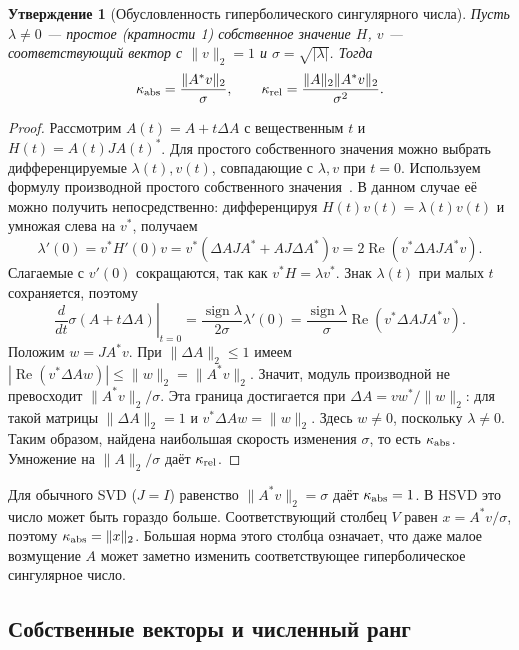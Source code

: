 \documentclass[a4paper,12pt]{article}
\theoremstyle{csstyle}
\newtheorem{proposition}[theorem]{Утверждение}
\begin{document}
\begin{proposition}[Обусловленность гиперболического сингулярного числа]
\label{analysis:prop-condition-number}
Пусть $\lambda\ne0$ --- простое (кратности 1) собственное значение $H$,
$v$ --- соответствующий вектор с $\|v\|_2=1$ и
$\sigma=\sqrt{|\lambda|}$. Тогда
\[
\kappa_{\rm abs}=\frac{\|A^*v\|_2}{\sigma},\qquad
\kappa_{\rm rel}=\frac{\|A\|_2\|A^*v\|_2}{\sigma^2}.
\]
\end{proposition}
\begin{proof}
Рассмотрим $A(t)=A+t\Delta A$ с вещественным $t$ и
$H(t)=A(t)JA(t)^*$. Для простого собственного значения можно
выбрать дифференцируемые $\lambda(t),v(t)$, совпадающие с $\lambda,v$
при $t=0$. Используем формулу производной простого собственного
значения~\cite[теорема~1]{GreenbaumLiOverton2020}. В данном случае её можно
получить непосредственно: дифференцируя $H(t)v(t)=\lambda(t)v(t)$
и умножая слева на $v^*$, получаем
\[
\lambda'(0)=v^*H'(0)v
=v^*(\Delta AJA^*+AJ\Delta A^*)v
=2\operatorname{Re}(v^*\Delta AJA^*v).
\]
Слагаемые с $v'(0)$ сокращаются, так как $v^*H=\lambda v^*$.
Знак $\lambda(t)$ при малых $t$ сохраняется, поэтому
\[
\left.\frac{d}{dt}\sigma(A+t\Delta A)\right|_{t=0}
=\frac{\operatorname{sign}\lambda}{2\sigma}\lambda'(0)
=\frac{\operatorname{sign}\lambda}{\sigma}
\operatorname{Re}(v^*\Delta AJA^*v).
\]
Положим $w=JA^*v$. При $\|\Delta A\|_2\le1$ имеем
$|\operatorname{Re}(v^*\Delta Aw)|\le\|w\|_2=\|A^*v\|_2$.
Значит, модуль производной не превосходит $\|A^*v\|_2/\sigma$.
Эта граница достигается при $\Delta A=vw^*/\|w\|_2$:
для такой матрицы $\|\Delta A\|_2=1$ и
$v^*\Delta Aw=\|w\|_2$. Здесь $w\ne0$, поскольку $\lambda\ne0$.
Таким образом, найдена наибольшая скорость изменения $\sigma$,
то есть $\kappa_{\rm abs}$. Умножение на $\|A\|_2/\sigma$
даёт $\kappa_{\rm rel}$.
\end{proof}

Для обычного SVD ($J=I$) равенство $\|A^*v\|_2=\sigma$
даёт $\kappa_{\rm abs}=1$. В HSVD это число может быть гораздо больше.
Соответствующий столбец $V$ равен
$x=A^*v/\sigma$, поэтому $\kappa_{\rm abs}=\|x\|_2$.
Большая норма этого столбца означает, что даже малое возмущение $A$ может заметно изменить соответствующее гиперболическое сингулярное число.

\subsection{Собственные векторы и численный ранг}
\end{document}

